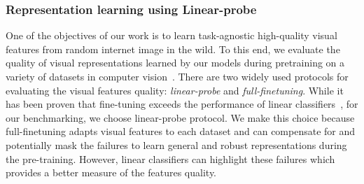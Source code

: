 \documentclass[10pt,twocolumn,letterpaper]{article}
\begin{document}
\subsubsection{Representation learning using Linear-probe}
\label{sec:summarize_representation_learning_main}

One of the objectives of our work is to learn task-agnostic high-quality visual features from random internet image in the wild. To this end, we evaluate the quality of visual representations learned by our models during pretraining on a variety of datasets in computer vision~\cite{zhai2020largescale}. There are two widely used protocols for evaluating the visual features quality: \textit{linear-probe} and \textit{full-finetuning}. While it has been proven that fine-tuning exceeds the performance of linear classifiers~\cite{zhai2020largescale}, for our benchmarking, we choose linear-probe protocol. We make this choice because full-finetuning adapts visual features to each dataset and can compensate for and potentially mask the failures to learn general and robust representations during the pre-training. However, linear classifiers can highlight these failures which provides a better measure of the features quality.  
\end{document}
